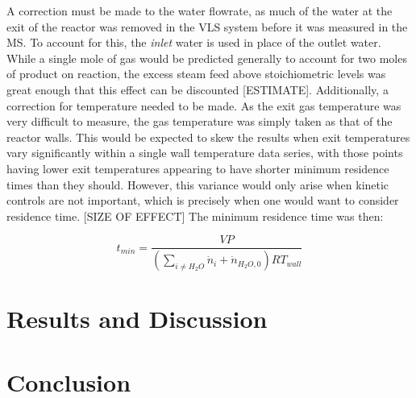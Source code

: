 \documentclass[11pt,twocolumn]{article}
\begin{document}
A correction must be made to the water flowrate, as much of the water at the exit of the reactor was removed in the VLS system before it was measured in the MS.  To account for this, the \emph{inlet} water is used in place of the outlet water.  While a single mole of gas would be predicted generally to account for two moles of product on reaction, the excess steam feed above stoichiometric levels was great enough that this effect can be discounted [ESTIMATE].  Additionally, a correction for temperature needed to be made.  As the exit gas temperature was very difficult to measure, the gas temperature was simply taken as that of the reactor walls.  This would be expected to skew the results when exit temperatures vary significantly within a single wall temperature data series, with those points having lower exit temperatures appearing to have shorter minimum residence times than they should.  However, this variance would only arise when kinetic controls are not important, which is precisely when one would want to consider residence time. [SIZE OF EFFECT]  The minimum residence time was then:

\begin{equation}
	t_{min} = \frac{VP}{(\sum_{i \ne H_{2}O}\dot{n}_{i}+\dot{n}_{H_{2}O,0})RT_{wall}}
\end{equation}


\section*{Results and Discussion}



\section*{Conclusion}



\newpage
\appendix
\onecolumn
\end{document}
